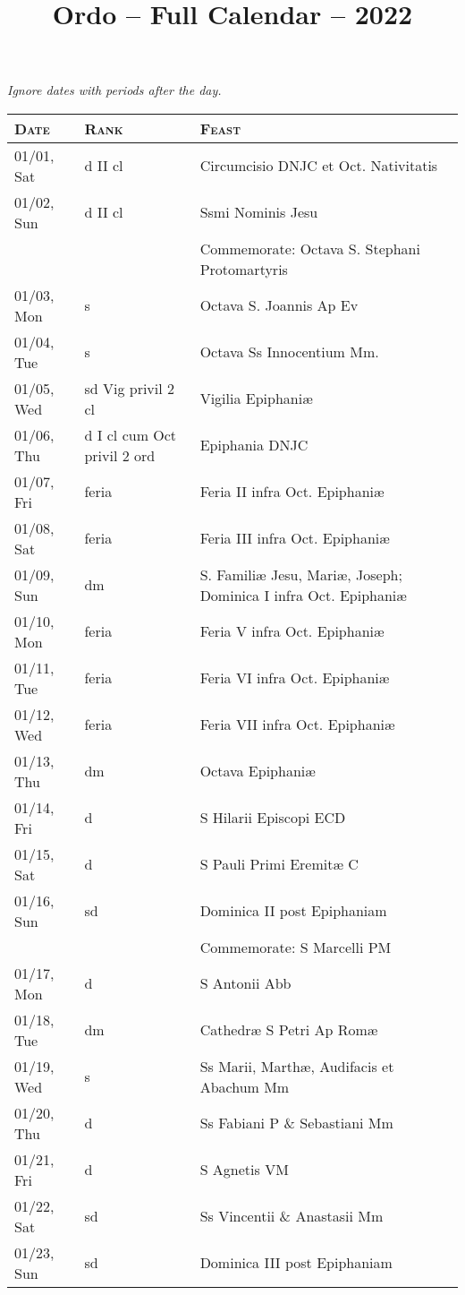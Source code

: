 \documentclass{article}
\title{Ordo -- Full Calendar -- 2022}
\begin{document}
\textit{\centering\footnotesize Ignore dates with periods after the day.}
\begin{longtable}{ l l l }
\hline
\textsc{Date} & \textsc{Rank} & \textsc{Feast} \\
\hline
\endhead
01/01, Sat & d II cl & Circumcisio DNJC et Oct. Nativitatis\\
01/02, Sun & d II cl & Ssmi Nominis Jesu\\
 & & Commemorate: Octava S. Stephani Protomartyris\\
01/03, Mon & s & Octava S. Joannis Ap Ev\\
01/04, Tue & s & Octava Ss Innocentium Mm.\\
01/05, Wed & sd Vig privil 2 cl & Vigilia Epiphaniæ\\
01/06, Thu & d I cl cum Oct privil 2 ord & Epiphania DNJC\\
01/07, Fri & feria & Feria II infra Oct. Epiphaniæ\\
01/08, Sat & feria & Feria III infra Oct. Epiphaniæ\\
01/09, Sun & dm & S. Familiæ Jesu, Mariæ, Joseph; Dominica I infra Oct. Epiphaniæ\\
01/10, Mon & feria & Feria V infra Oct. Epiphaniæ\\
01/11, Tue & feria & Feria VI infra Oct. Epiphaniæ\\
01/12, Wed & feria & Feria VII infra Oct. Epiphaniæ\\
01/13, Thu & dm & Octava Epiphaniæ\\
01/14, Fri & d & S Hilarii Episcopi ECD\\
01/15, Sat & d & S Pauli Primi Eremitæ C\\
01/16, Sun & sd & Dominica II post Epiphaniam\\
 & & Commemorate: S Marcelli PM\\
01/17, Mon & d & S Antonii Abb\\
01/18, Tue & dm & Cathedræ S Petri Ap Romæ\\
01/19, Wed & s & Ss Marii, Marthæ, Audifacis et Abachum Mm\\
01/20, Thu & d & Ss Fabiani P \& Sebastiani Mm\\
01/21, Fri & d & S Agnetis VM\\
01/22, Sat & sd & Ss Vincentii \& Anastasii Mm\\
01/23, Sun & sd & Dominica III post Epiphaniam\\

\end{longtable}
\end{document}
